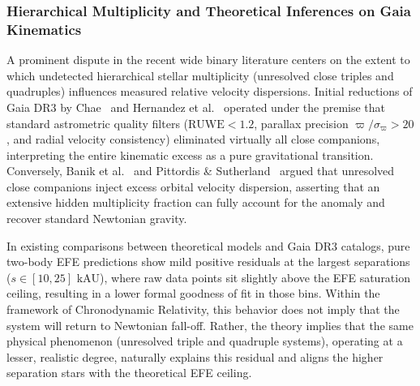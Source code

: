 \documentclass[aps,prd,reprint,superscriptaddress,nofootinbib,twocolumn,floatfix]{revtex4-2}
\begin{document}
\subsubsection{Hierarchical Multiplicity and Theoretical Inferences on Gaia Kinematics}
A prominent dispute in the recent wide binary literature centers on the extent to which undetected hierarchical stellar multiplicity (unresolved close triples and quadruples) influences measured relative velocity dispersions. Initial reductions of Gaia DR3 by Chae~\cite{chae2023breakdown,chae2024robust} and Hernandez et al.~\cite{hernandez2023internal} operated under the premise that standard astrometric quality filters ($\text{RUWE} < 1.2$, parallax precision $\varpi / \sigma_\varpi > 20$, and radial velocity consistency) eliminated virtually all close companions, interpreting the entire kinematic excess as a pure gravitational transition. Conversely, Banik et al.~\cite{banik2024strong} and Pittordis \& Sutherland~\cite{pittordis2023testing} argued that unresolved close companions inject excess orbital velocity dispersion, asserting that an extensive hidden multiplicity fraction can fully account for the anomaly and recover standard Newtonian gravity.

In existing comparisons between theoretical models and Gaia DR3 catalogs, pure two-body EFE predictions show mild positive residuals at the largest separations ($s \in [10, 25]\text{ kAU}$), where raw data points sit slightly above the EFE saturation ceiling, resulting in a lower formal goodness of fit in those bins. Within the framework of Chronodynamic Relativity, this behavior does not imply that the system will return to Newtonian fall-off. Rather, the theory implies that the same physical phenomenon (unresolved triple and quadruple systems), operating at a lesser, realistic degree, naturally explains this residual and aligns the higher separation stars with the theoretical EFE ceiling.
\end{document}
